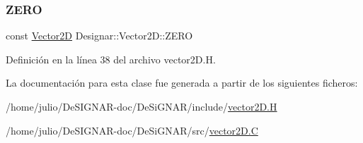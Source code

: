 \subsubsection{\texorpdfstring{Z\+E\+RO}{ZERO}}
{\footnotesize\ttfamily const \hyperlink{class_designar_1_1_vector2_d}{Vector2D} Designar\+::\+Vector2\+D\+::\+Z\+E\+RO\hspace{0.3cm}{\ttfamily [static]}}



Definición en la línea 38 del archivo vector2\+D.\+H.



La documentación para esta clase fue generada a partir de los siguientes ficheros\+:\begin{DoxyCompactItemize}
\item 
/home/julio/\+De\+S\+I\+G\+N\+A\+R-\/doc/\+De\+Si\+G\+N\+A\+R/include/\hyperlink{vector2_d_8_h}{vector2\+D.\+H}\item 
/home/julio/\+De\+S\+I\+G\+N\+A\+R-\/doc/\+De\+Si\+G\+N\+A\+R/src/\hyperlink{vector2_d_8_c}{vector2\+D.\+C}\end{DoxyCompactItemize}
